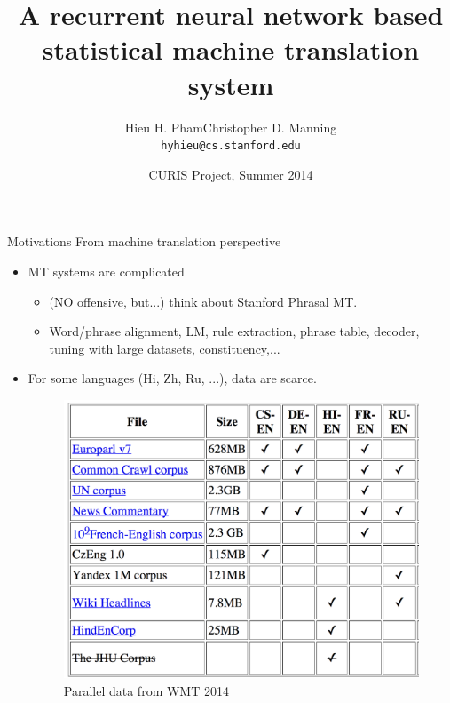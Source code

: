\documentclass[pdf]{beamer}
\title{A recurrent neural network based statistical machine translation system}
\author{Hieu H. Pham\hspace{1.0cm}Christopher D. Manning\\{\tt hyhieu@cs.stanford.edu}}
\date{CURIS Project, Summer 2014}
\begin{document}
\begin{frame}
\titlepage
\end{frame}

\begin{frame}{Motivations}
From machine translation perspective
\begin{itemize}
\item MT systems are complicated
\begin{itemize}
\item (NO offensive, but...) think about Stanford Phrasal MT.
\item Word/phrase alignment, LM, rule extraction, phrase table, decoder, tuning with large datasets, constituency,...
\end{itemize}
\item For some languages (Hi, Zh, Ru, ...), data are scarce.
\begin{figure}
\begin{center}
\includegraphics[scale=0.25]{wmt_data.png}
\end{center}
\caption{\scriptsize{Parallel data from WMT 2014}}
\end{figure}
\end{itemize}
\end{frame}
\end{document}
